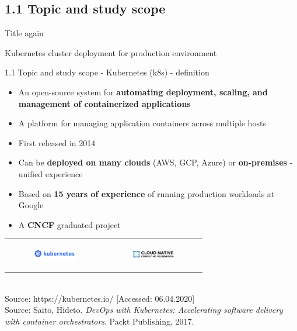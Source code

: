 \documentclass{beamer}
\begin{document}
\subsection{1.1 Topic and study scope}	
\begin{frame}{Title again}%
\begin{center}
\LARGE{Kubernetes cluster deployment for production environment}
\end{center}
\end{frame}

\begin{frame}{1.1 Topic and study scope - Kubernetes (k8s) - definition}%
\begin{itemize}
\item An open-source system for \textbf{automating deployment, scaling, and management of containerized applications}
\item A platform for managing application containers across multiple hosts
\item First released in 2014
\item Can be \textbf{deployed on many clouds} (AWS, GCP, Azure) or \textbf{on-premises} - unified experience
\item Based on \textbf{15 years of experience} of running production workloads at Google
\item A \textbf{CNCF} graduated project
\end{itemize}
\begin{tabular}{  c c }
\begin{figure}
	\includegraphics[width=2cm]{figures/kubernetes-logo.png}
	\label{fig:kubernetes-logo}
\end{figure} &
\begin{figure}
	\includegraphics[width=2cm]{figures/cncf-logo.png}
	\label{fig:cncf-logo}
\end{figure} 
\end{tabular} \\
\tiny{Source: https://kubernetes.io/ [Accessed: 06.04.2020]} \\
\tiny{Source: Saito, Hideto. \textit{DevOps with Kubernetes: Accelerating software delivery with container orchestrators}. Packt Publishing, 2017.}
\end{frame}
\end{document}
